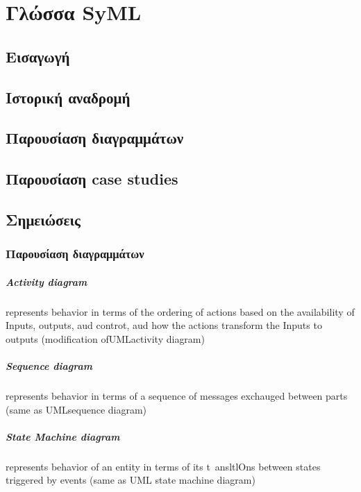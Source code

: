 \documentclass[a4paper,12pt,twoside]{report}
\begin{document}
{%
	\chapter{Γλώσσα SyML}
		\label{κεφ.:Γλώσσα SyML}
		
		\section{Εισαγωγή}
		\section{Ιστορική αναδρομή}
		\section{Παρουσίαση διαγραμμάτων}
		\section{Παρουσίαση case studies}


		\section{Σημειώσεις}	
		\subsection{Παρουσίαση διαγραμμάτων \cite{APracticalGuideToSysML}}
			
			\paragraph{Activity diagram} {represents behavior in terms of the ordering of actions based on the availability of Inputs, outputs, aud controt, aud how the actions transform the Inputs to outputs (modification ofUMLactivity diagram)
			}
			\paragraph{Sequence diagram} {represents behavior in terms of a sequence of messages exchauged between parts (same as UMLsequence diagram)
			}
			\paragraph{State Machine diagram} {represents behavior of an entity in terms of its t~ansltlOns between states triggered by events (same as UML state machine diagram)
			}
}
\end{document}
